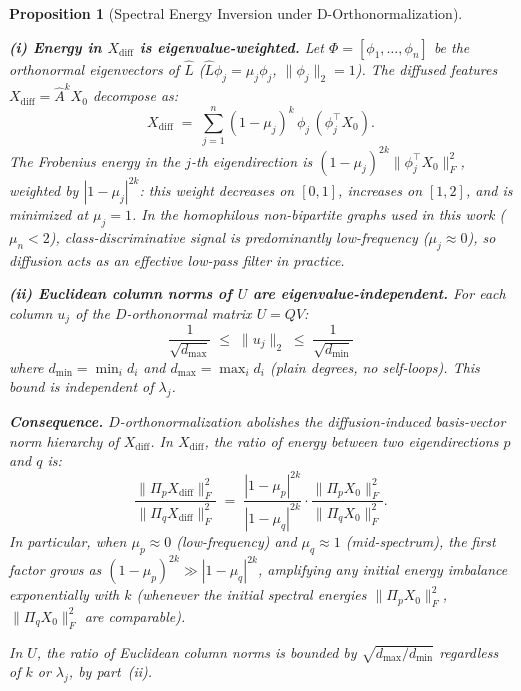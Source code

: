 \documentclass[11pt]{article}
\newtheorem{proposition}{Proposition}
\begin{document}
\begin{proposition}[Spectral Energy Inversion under D-Orthonormalization]
\label{prop:energy_inversion}
\hfill

\noindent\textbf{(i) Energy in $X_{\mathrm{diff}}$ is eigenvalue-weighted.}
Let $\Phi = [\phi_1,\ldots,\phi_n]$ be the orthonormal eigenvectors of $\hat{L}$
($\hat{L}\phi_j = \mu_j\phi_j$, $\|\phi_j\|_2 = 1$).
The diffused features $X_{\mathrm{diff}} = \hat{A}^k X_0$ decompose as:
\[
  X_{\mathrm{diff}} \;=\; \sum_{j=1}^{n} (1-\mu_j)^k\,\phi_j\,(\phi_j^\top X_0).
\]
The Frobenius energy in the $j$-th eigendirection is
$(1{-}\mu_j)^{2k}\|\phi_j^\top X_0\|_F^2$,
weighted by $|1-\mu_j|^{2k}$: this weight decreases on $[0,1]$, increases on $[1,2]$,
and is minimized at $\mu_j = 1$.
In the homophilous non-bipartite graphs used in this work ($\mu_n < 2$),
class-discriminative signal is predominantly low-frequency ($\mu_j \approx 0$),
so diffusion acts as an effective low-pass filter in practice.

\noindent\textbf{(ii) Euclidean column norms of $U$ are eigenvalue-independent.}
For each column $u_j$ of the $D$-orthonormal matrix $U = QV$:
\[
  \frac{1}{\sqrt{d_{\max}}} \;\leq\; \|u_j\|_2 \;\leq\; \frac{1}{\sqrt{d_{\min}}}
\]
where $d_{\min} = \min_i d_i$ and $d_{\max} = \max_i d_i$ (plain degrees, no self-loops).
This bound is \emph{independent of $\lambda_j$}.

\noindent\textbf{Consequence.}
$D$-orthonormalization abolishes the diffusion-induced basis-vector norm hierarchy of
$X_{\mathrm{diff}}$.
In $X_{\mathrm{diff}}$, the ratio of energy between two eigendirections $p$ and $q$ is:
\[
  \frac{\|\Pi_p X_{\mathrm{diff}}\|_F^2}{\|\Pi_q X_{\mathrm{diff}}\|_F^2}
  \;=\;
  \frac{|1-\mu_p|^{2k}}{|1-\mu_q|^{2k}}
  \cdot
  \frac{\|\Pi_p X_0\|_F^2}{\|\Pi_q X_0\|_F^2}.
\]
In particular, when $\mu_p \approx 0$ (low-frequency) and $\mu_q \approx 1$
(mid-spectrum), the first factor grows as $(1-\mu_p)^{2k} \gg |1-\mu_q|^{2k}$,
amplifying any initial energy imbalance exponentially with $k$
(whenever the initial spectral energies $\|\Pi_p X_0\|_F^2$,
$\|\Pi_q X_0\|_F^2$ are comparable).

In $U$, the ratio of Euclidean column norms is bounded by $\sqrt{d_{\max}/d_{\min}}$
regardless of $k$ or $\lambda_j$, by part~(ii).
\end{proposition}
\end{document}
